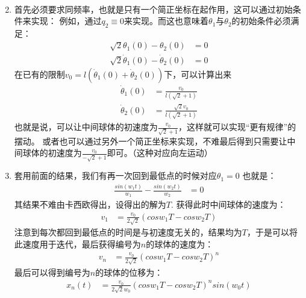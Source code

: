 \begin{enumerate}
\begin{align*}
	\end{align*}
	\item 首先必须要求同频率，也就是只有一个简正坐标在起作用，这可以通过初始条件来实现：
	例如，通过\(q_2\equiv 0\)来实现。而这也意味着\(\theta_1\)与\(\theta_2\)的初始条件必须满足：
	\begin{align*}
		\sqrt{2}\theta_1(0)-\theta_2(0) &= 0 \\
		\sqrt{2}\dot{\theta}_1(0)-\dot{\theta}_2(0) &= 0 
	\end{align*}
	在已有的限制\(v_{0}= l(\dot{\theta}_1(0)+\dot{\theta}_2(0))\)下，可以计算出来
	\begin{align*}
		\dot{\theta}_1(0) &= \frac{v_0}{l(\sqrt{2}+1)} \\
		\dot{\theta}_2(0) &= \frac{\sqrt{2}v_0}{l(\sqrt{2}+1)}
	\end{align*}
	也就是说，可以让中间球体的初速度为\(\frac{v_0}{\sqrt{2}+1}\)，这样就可以实现“更有规律”的摆动。
	或者也可以通过另外一个简正坐标来实现，不难最后得到只需要让中间球体的初速度为\(\frac{v_0}{-\sqrt{2}+1}\)即可。（这种对应向左运动）
	\item 套用前面的结果，我们有再一次回到最低点的时候对应\(\theta_1=0\)
	也就是：
	\begin{align*}
		\frac{sin(w_1 t)}{w_1} - \frac{sin(w_2 t)}{w_2}
		&= 0 
	\end{align*}
	其结果不难由卡西欧得出，设得出的解为\(T\).
	获得此时中间球体的速度为：
	\begin{align*}
		v_{1} &= \frac{v_0}{2\sqrt{2}}(cosw_1 T - cosw_2 T) 
	\end{align*}
	注意到每次都回到最低点的时间是与初速度无关的，结果均为\(T\)，于是可以将此速度用于迭代，最后获得编号为\(n\)的球体的速度为：
	\begin{align*}
		v_{n} &= \frac{v_0}{2\sqrt{2}}(cosw_1 T - cosw_2 T)^{n} 
	\end{align*}
	最后可以得到编号为\(n\)的球体的位移为：
	\begin{align*}
		x_{n}(t) &= \frac{v_0}{2\sqrt{2}w_0}(cosw_1 T - cosw_2 T)^{n} sin (w_0 t)
	\end{align*}


\end{enumerate}